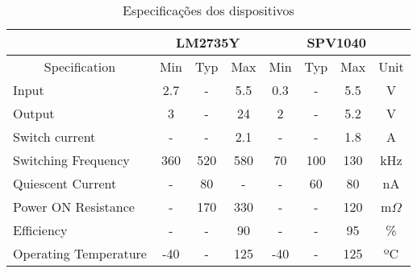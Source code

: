 \begin{table}
\centering
\caption{Especificações dos dispositivos}
\label{comparison_specs_table}
\begin{tabular}{|l|ccc|ccc|c|} 
\cline{2-8}
\multicolumn{1}{c|}{}               & \multicolumn{3}{c|}{LM2735Y}                              & \multicolumn{4}{c|}{SPV1040}                                           \\ 
\hline
\multicolumn{1}{|c|}{Specification} & \multicolumn{1}{c|}{Min} & \multicolumn{1}{c|}{Typ} & Max & \multicolumn{1}{c|}{Min} & \multicolumn{1}{c|}{Typ} & Max & Unit       \\ 
\hline
Input                               & 2.7                      & -                        & 5.5 & 0.3                      & -                        & 5.5 & V          \\ 
\hline
Output                              & 3                        & -                        & 24  & 2                        & -                        & 5.2 & V          \\ 
\hline
Switch current                      & -                        & -                        & 2.1 & -                        & -                        & 1.8 & A          \\ 
\hline
Switching Frequency                 & 360                      & 520                      & 580 & 70                       & 100                      & 130 & kHz        \\ 
\hline
Quiescent Current                   & -                        & 80                       & -   & -                        & 60                       & 80  & nA         \\ 
\hline
Power ON Resistance                 & -                        & 170                      & 330 & -                        & -                        & 120 & m$\Omega$  \\ 
\hline
Efficiency                          & -                        & -                        & 90  & -                        & -                        & 95  & \%         \\ 
\hline
Operating Temperature               & -40                      & -                        & 125 & -40                      & -                        & 125 & ºC         \\
\hline
\end{tabular}
\end{table}